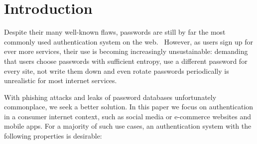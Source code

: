 \section{Introduction}

Despite their many well-known flaws, passwords are still by far the most commonly used
authentication system on the web.~\cite{Bonneau12} However, as users sign up for ever more services,
their use is becoming increasingly unsustainable: demanding that users choose passwords with
sufficient entropy, use a different password for every site, not write them down and even rotate
passwords periodically is unrealistic for most internet services.

With phishing attacks and leaks of password databases unfortunately commonplace, we seek a better
solution. In this paper we focus on authentication in a consumer internet context, such as social
media or e-commerce websites and mobile apps. For a majority of such use cases, an authentication
system with the following properties is desirable:

